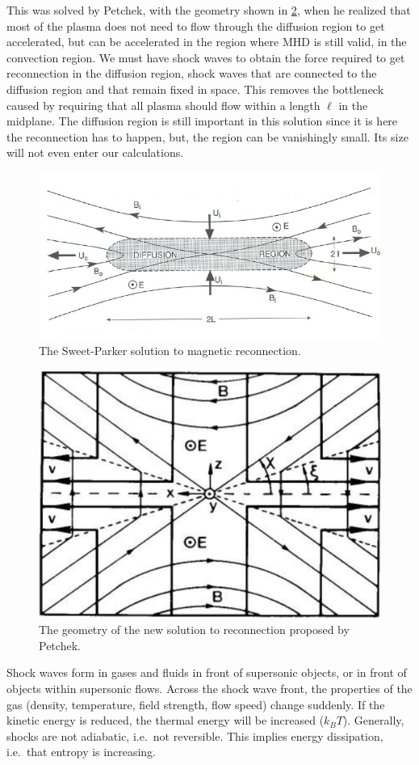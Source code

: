 This was solved by Petchek, with the geometry shown in \cref{fig:L8_reconnection_new_solution}, when he realized that most of the plasma does not need to flow through the diffusion region to get accelerated, but can be accelerated in the region where MHD is still valid, in the convection region. We must have shock waves to obtain the force required to get reconnection in the diffusion region, shock waves that are connected to the diffusion region and that remain fixed in space. This removes the bottleneck caused by requiring that all plasma should flow within a length \(\ell \) in the midplane. The diffusion region is still important in this solution since it is here the reconnection has to happen, but, the region can be vanishingly small. Its size will not even enter our calculations.
\begin{figure}[t]
    \centering
    \includegraphics[width=.6\linewidth]{bilder/L8_mag_recon.png}
    \caption{The Sweet-Parker solution to magnetic reconnection.}\label{fig:L8_mag_recon}
\end{figure}
\begin{figure}[t]
    \centering
    \includegraphics[width=.7\linewidth]{bilder/L8_reconnection_new_solution.jpg}
    \caption{The geometry of the new solution to reconnection proposed by Petchek.}\label{fig:L8_reconnection_new_solution}
\end{figure}

Shock waves form in gases and fluids in front of supersonic objects, or in front of objects within supersonic flows. Across the shock wave front, the properties of the gas (density, temperature, field strength, flow speed) change suddenly. If the kinetic energy is reduced, the thermal energy will be increased (\(k_{B}T\)). Generally, shocks are not adiabatic, i.e.\ not reversible. This implies energy dissipation, i.e.\ that entropy is increasing.

